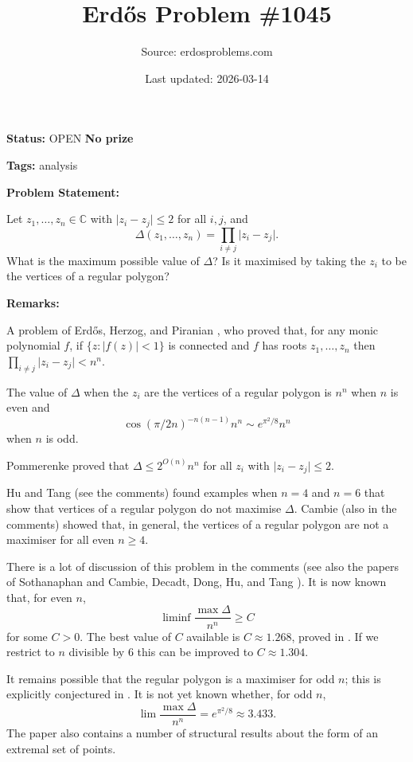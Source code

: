 \documentclass{article}
\title{Erd\H{o}s Problem \#1045}
\date{Last updated: 2026-03-14}
\author{Source: erdosproblems.com}
\begin{document}
\maketitle

\noindent\textbf{Status:} OPEN \quad \textbf{No prize}

\noindent\textbf{Tags:} analysis

\medskip
\noindent\textbf{Problem Statement:}

Let $z_1,\ldots,z_n\in \mathbb{C}$ with $\lvert z_i-z_j\rvert\leq 2$ for all $i,j$, and\[\Delta(z_1,\ldots,z_n)=\prod_{i\neq j}\lvert z_i-z_j\rvert.\]What is the maximum possible value of $\Delta$? Is it maximised by taking the $z_i$ to be the vertices of a regular polygon?

\bigskip
\noindent\textbf{Remarks:}

A problem of Erd\H{o}s, Herzog, and Piranian \cite{EHP58}, who proved that, for any monic polynomial $f$, if $\{ z: \lvert f(z)\rvert <1\}$ is connected and $f$ has roots $z_1,\ldots,z_n$ then $\prod_{i\neq j}\lvert z_i-z_j\rvert <n^n$.

The value of $\Delta$ when the $z_i$ are the vertices of a regular polygon is $n^n$ when $n$ is even and\[\cos(\pi/2n)^{-n(n-1)}n^n \sim e^{\pi^2/8}n^n\]when $n$ is odd.

Pommerenke \cite{Po61} proved that $\Delta \leq 2^{O(n)}n^n$ for all $z_i$ with $\lvert z_i-z_j\rvert \leq 2$.

Hu and Tang (see the comments) found examples when $n=4$ and $n=6$ that show that vertices of a regular polygon do not maximise $\Delta$. Cambie (also in the comments) showed that, in general, the vertices of a regular polygon are not a maximiser for all even $n\geq 4$.

There is a lot of discussion of this problem in the comments (see also the papers of Sothanaphan \cite{So25} and Cambie, Decadt, Dong, Hu, and Tang \cite{CDDHT26}). It is now known that, for even $n$,\[\liminf \frac{\max \Delta}{n^n}\geq C\]for some $C>0$. The best value of $C$ available is $C\approx 1.268$, proved in \cite{CDDHT26}. If we restrict to $n$ divisible by $6$ this can be improved to $C\approx 1.304$.

It remains possible that the regular polygon is a maximiser for odd $n$; this is explicitly conjectured in \cite{CDDHT26}. It is not yet known whether, for odd $n$,\[\lim \frac{\max \Delta}{n^n}=e^{\pi^2/8}\approx 3.433.\]The paper \cite{CDDHT26} also contains a number of structural results about the form of an extremal set of points.
\end{document}
